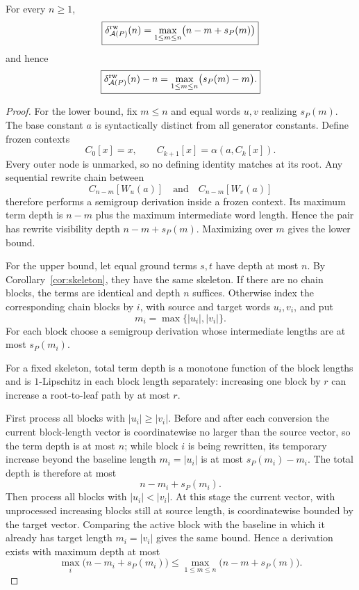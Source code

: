 \begin{theorem}\label{thm:envelope}
For every $n\ge1$,
\begin{equation}
\boxed{
\delta^{\mathrm{rw}}_{\mathcal A(P)}(n)
=
\max_{1\le m\le n}\bigl(n-m+s_P(m)\bigr)}
\label{eq:envelope}
\end{equation}
and hence
\begin{equation}
\boxed{
\delta^{\mathrm{rw}}_{\mathcal A(P)}(n)-n
=
\max_{1\le m\le n}\bigl(s_P(m)-m\bigr).}
\label{eq:overhead}
\end{equation}
\end{theorem}

\begin{proof}
For the lower bound, fix $m\le n$ and equal words $u,v$ realizing $s_P(m)$.  The base constant $a$ is syntactically distinct from all generator constants.  Define frozen contexts
\[
C_0[x]=x,
\qquad
C_{k+1}[x]=\alpha(a,C_k[x]).
\]
Every outer node is unmarked, so no defining identity matches at its root.  Any sequential rewrite chain between
\[
C_{n-m}[W_u(a)]
\quad\text{and}\quad
C_{n-m}[W_v(a)]
\]
therefore performs a semigroup derivation inside a frozen context.  Its maximum term depth is $n-m$ plus the maximum intermediate word length.  Hence the pair has rewrite visibility depth $n-m+s_P(m)$.  Maximizing over $m$ gives the lower bound.

For the upper bound, let equal ground terms $s,t$ have depth at most $n$.  By Corollary~\ref{cor:skeleton}, they have the same skeleton.  If there are no chain blocks, the terms are identical and depth $n$ suffices. Otherwise index the corresponding chain blocks by $i$, with source and target words $u_i,v_i$, and put
\[
m_i=\max\{|u_i|,|v_i|\}.
\]
For each block choose a semigroup derivation whose intermediate lengths are at most $s_P(m_i)$.

For a fixed skeleton, total term depth is a monotone function of the block lengths and is $1$-Lipschitz in each block length separately: increasing one block by $r$ can increase a root-to-leaf path by at most $r$.

First process all blocks with $|u_i|\ge|v_i|$.  Before and after each conversion the current block-length vector is coordinatewise no larger than the source vector, so the term depth is at most $n$; while block $i$ is being rewritten, its temporary increase beyond the baseline length $m_i=|u_i|$ is at most $s_P(m_i)-m_i$.  The total depth is therefore at most
\[
n-m_i+s_P(m_i).
\]
Then process all blocks with $|u_i|<|v_i|$.  At this stage the current vector, with unprocessed increasing blocks still at source length, is coordinatewise bounded by the target vector.  Comparing the active block with the baseline in which it already has target length $m_i=|v_i|$ gives the same bound.  Hence a derivation exists with maximum depth at most
\[
\max_i\bigl(n-m_i+s_P(m_i)\bigr)
\le
\max_{1\le m\le n}\bigl(n-m+s_P(m)\bigr).
\]
\end{proof}


